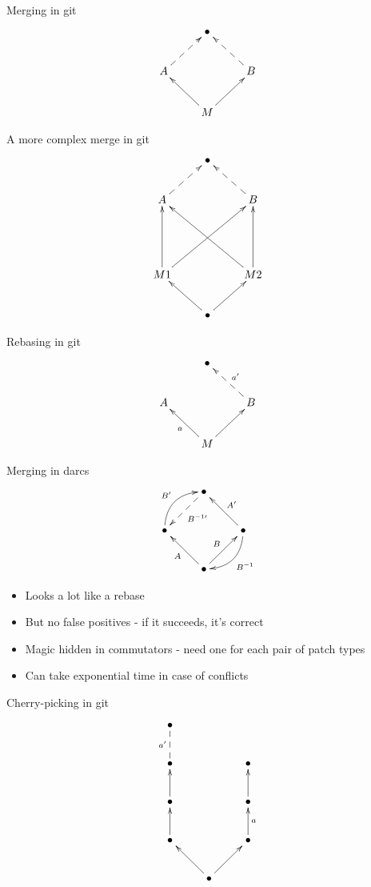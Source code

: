 \documentclass[pdf]{prosper}
\begin{document}

\begin{slide}{Merging in git}
\[
\xymatrix{
& \bullet \\
A \ar@{-->}[ur] & & B \ar@{-->}[ul] \\
& M \ar[ul] \ar[ur]
}
\]
\end{slide}

\begin{slide}{A more complex merge in git}
\[
\xymatrix{
& \bullet \\
A \ar@{-->}[ur] & & B \ar@{-->}[ul] \\
\\
M1 \ar[uu] \ar[uurr]
&& M2 \ar[uull] \ar[uu] \\
& \bullet \ar[ul] \ar[ur]
}
\]
\end{slide}

\begin{slide}{Rebasing in git}
\[
\xymatrix{
& \bullet \\
A & & B \ar@{-->}_{a'}[ul] \\
& M \ar[ul]^a \ar[ur]
}
\]
\end{slide}

\begin{slide}{Merging in darcs}
\[
\xymatrix{
& \bullet \ar@{-->}[dl]^*{\object{\scriptstyle{B^{-1\prime}}}} \\
\bullet \ar@/^1pc/[ur]^{B'}
& & \bullet \ar@/^1pc/[dl]^*{\object{\scriptstyle{B^{-1}}}} \ar[ul]_{A'} \\
& \bullet \ar[ul]^A \ar[ur]^B
}
\]
\begin{itemize}
\item Looks a lot like a rebase
\item But no false positives - if it succeeds, it's correct
\item Magic hidden in commutators - need one for each pair of patch types
\item Can take exponential time in case of conflicts
\end{itemize}
\end{slide}


\begin{slide}{Cherry-picking in git}
\[
\xymatrix{
	\bullet \\
	\bullet \ar@{--}[u]^{a'} && \bullet \\
	\bullet \ar[u] && \bullet \ar[u] \\
	\bullet \ar[u] && \bullet \ar[u]_a \\
	& \bullet \ar[ul] \ar[ur]
}
\]
\end{slide}
\end{document}
